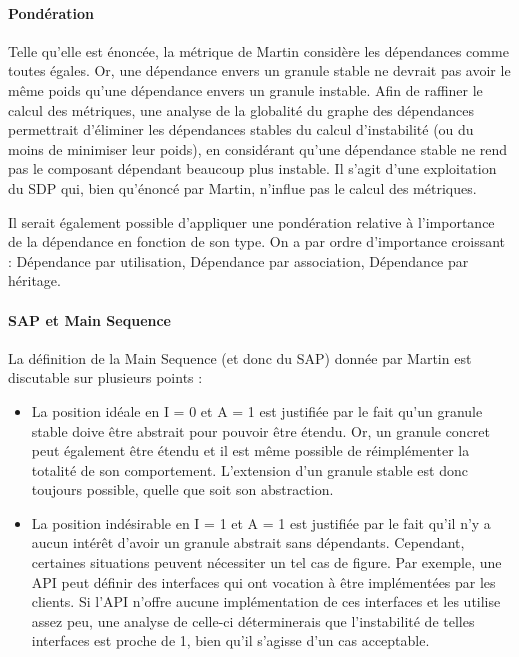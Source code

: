 \documentclass{scrartcl}
\begin{document}
    \paragraph{Pondération}Telle qu'elle est énoncée, la métrique de Martin considère les dépendances comme toutes égales. Or, une dépendance envers un granule stable ne devrait pas avoir le même poids qu'une dépendance envers un granule instable. Afin de raffiner le calcul des métriques, une analyse de la globalité du graphe des dépendances permettrait d'éliminer les dépendances stables du calcul d'instabilité (ou du moins de minimiser leur poids), en considérant qu'une dépendance stable ne rend pas le composant dépendant beaucoup plus instable. Il s'agit d'une exploitation du SDP qui, bien qu'énoncé par Martin, n'influe pas le calcul des métriques.
    
    Il serait également possible d'appliquer une pondération relative à l'importance de la dépendance en fonction de son type. On a par ordre d'importance croissant : Dépendance par utilisation, Dépendance par association, Dépendance par héritage.
    
    \paragraph{SAP et Main Sequence}La définition de la Main Sequence (et donc du SAP) donnée par Martin est discutable sur plusieurs points :
    \begin{itemize}
        \item La position idéale en I = 0 et A = 1 est justifiée par le fait qu'un granule stable doive être abstrait pour pouvoir être étendu. Or, un granule concret peut également être étendu et il est même possible de réimplémenter la totalité de son comportement. L'extension d'un granule stable est donc toujours possible, quelle que soit son abstraction.
        \item La position indésirable en I = 1 et A = 1 est justifiée par le fait qu'il n'y a aucun intérêt d'avoir un granule abstrait sans dépendants. Cependant, certaines situations peuvent nécessiter un tel cas de figure. Par exemple, une API peut définir des interfaces qui ont vocation à être implémentées par les clients. Si l'API n'offre aucune implémentation de ces interfaces et les utilise assez peu, une analyse de celle-ci déterminerais que l'instabilité de telles interfaces est proche de 1, bien qu'il s'agisse d'un cas acceptable.
    \end{itemize}
\end{document}
